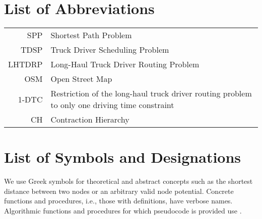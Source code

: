 

\appendix

{}	%
{}	%

\section{List of Abbreviations}
\label{app:abb}

\begin{tabular}{rp{}}
	SPP    & Shortest Path Problem                                                                         \\
	TDSP   & Truck Driver Scheduling Problem                                                               \\
	LHTDRP & Long-Haul Truck Driver Routing Problem                                                        \\
	OSM    & Open Street Map                                                                               \\
	1-DTC  & Restriction of the long-haul truck driver routing problem to only one driving time constraint \\
	CH     & Contraction Hierarchy                                                                         \\
\end{tabular}



\section{List of Symbols and Designations}
\label{app:symbols}

We use Greek symbols for theoretical and abstract concepts such as the shortest distance between two nodes or an arbitrary valid node potential. Concrete functions and procedures, i.e., those with definitions, have verbose names. Algorithmic functions and procedures for which pseudocode is provided use .

